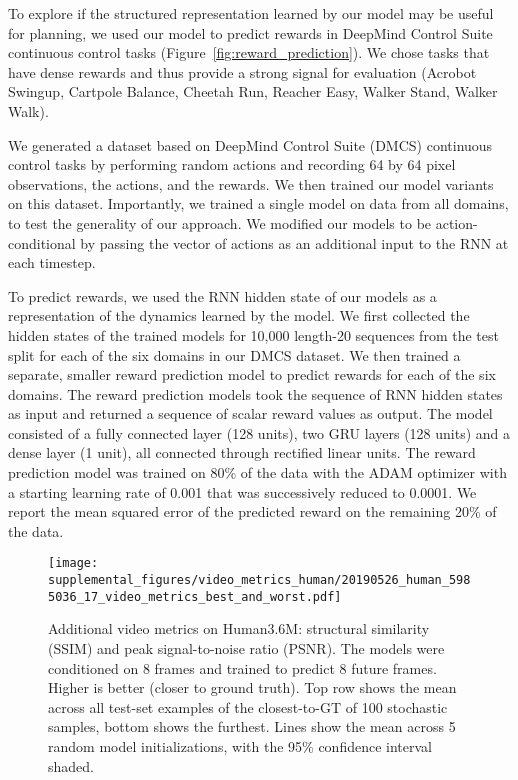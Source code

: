 To explore if the structured representation learned by our model may be useful for planning, we used our model to predict rewards in DeepMind Control Suite \cite{tassa_deepmind_2018} continuous control tasks (Figure~\ref{fig:reward_prediction}). We chose tasks that have dense rewards and thus provide a strong signal for evaluation (Acrobot Swingup, Cartpole Balance, Cheetah Run, Reacher Easy, Walker Stand, Walker Walk).

We generated a dataset based on DeepMind Control Suite (DMCS) continuous control tasks by performing random actions and recording 64 by 64 pixel observations, the actions, and the rewards. We then trained our model variants on this dataset. Importantly, we trained a single model on data from all domains, to test the generality of our approach. We modified our models to be action-conditional by passing the vector of actions as an additional input to the RNN at each timestep.

To predict rewards, we used the RNN hidden state of our models as a representation of the dynamics learned by the model. We first collected the hidden states of the trained models for 10,000 length-20 sequences from the test split for each of the six domains in our DMCS dataset. We then trained a separate, smaller reward prediction model to predict rewards for each of the six domains. The reward prediction models took the sequence of RNN hidden states as input and returned a sequence of scalar reward values as output. The model consisted of a fully connected layer (128 units), two GRU layers (128 units) and a dense layer (1 unit), all connected through rectified linear units. The reward prediction model was trained on 80\% of the data with the ADAM optimizer with a starting learning rate of 0.001 that was successively reduced to 0.0001. We report the mean squared error of the predicted reward on the remaining 20\% of the data.

\begin{figure*}[h]
    \centering
\texttt{[image: supplemental\_figures/video\_metrics\_human/20190526\_human\_5985036\_17\_video\_metrics\_best\_and\_worst.pdf]}
    \caption{Additional video metrics on Human3.6M: structural similarity (SSIM) and peak signal-to-noise ratio (PSNR). The models were conditioned on 8 frames and trained to predict 8 future frames. Higher is better (closer to ground truth). Top row shows the mean across all test-set examples of the closest-to-GT of 100 stochastic samples, bottom shows the furthest. Lines show the mean across 5 random model initializations, with the 95\% confidence interval shaded. } 
    \label{fig:sup_video_metrics_human}
\end{figure*}

